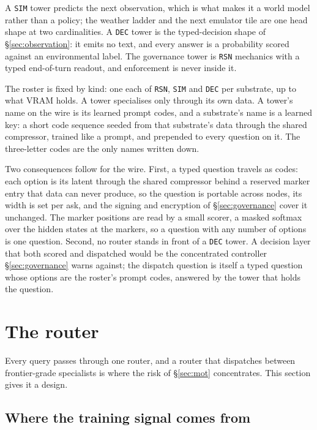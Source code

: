 \documentclass[11pt]{article}
\begin{document}
A \texttt{SIM} tower predicts the next observation, which is what makes it a world model rather than a policy; the weather ladder and the next emulator tile are one head shape at two cardinalities. A \texttt{DEC} tower is the typed-decision shape of \S\ref{sec:observation}: it emits no text, and every answer is a probability scored against an environmental label. The governance tower is \texttt{RSN} mechanics with a typed end-of-turn readout, and enforcement is never inside it.

The roster is fixed by kind: one each of \texttt{RSN}, \texttt{SIM} and \texttt{DEC} per substrate, up to what VRAM holds. A tower specialises only through its own data. A tower's name on the wire is its learned prompt codes, and a substrate's name is a learned key: a short code sequence seeded from that substrate's data through the shared compressor, trained like a prompt, and prepended to every question on it. The three-letter codes are the only names written down.

Two consequences follow for the wire. First, a typed question travels as codes: each option is its latent through the shared compressor behind a reserved marker entry that data can never produce, so the question is portable across nodes, its width is set per ask, and the signing and encryption of \S\ref{sec:governance} cover it unchanged. The marker positions are read by a small scorer, a masked softmax over the hidden states at the markers, so a question with any number of options is one question. Second, no router stands in front of a \texttt{DEC} tower. A decision layer that both scored and dispatched would be the concentrated controller \S\ref{sec:governance} warns against; the dispatch question is itself a typed question whose options are the roster's prompt codes, answered by the tower that holds the question.

\section{The router}
\label{sec:router}

Every query passes through one router, and a router that dispatches between frontier-grade specialists is where the risk of \S\ref{sec:mot} concentrates. This section gives it a design.

\subsection{Where the training signal comes from}
\end{document}

